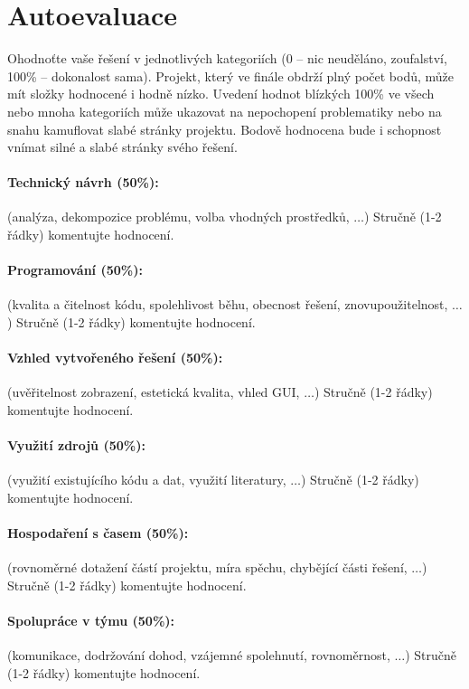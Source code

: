 \documentclass[11pt,a4paper]{article}
\begin{document}
\section{Autoevaluace}

Ohodnoťte vaše řešení v jednotlivých kategoriích (0 – nic neuděláno,
zoufalství, 100\% – dokonalost sama). Projekt, který ve finále obdrží plný
počet bodů, může mít složky hodnocené i hodně nízko. Uvedení hodnot blízkých
100\% ve všech nebo mnoha kategoriích může ukazovat na nepochopení problematiky
nebo na snahu kamuflovat slabé stránky projektu. Bodově hodnocena bude i
schopnost vnímat silné a slabé stránky svého řešení.

\paragraph{Technický návrh (50\%):} (analýza, dekompozice problému, volba
vhodných prostředků, $\ldots$) 
Stručně (1-2 řádky) komentujte hodnocení. 

\paragraph{Programování (50\%):} (kvalita a čitelnost kódu, spolehlivost běhu,
obecnost řešení, znovupoužitelnost, $\ldots$)
Stručně (1-2 řádky) komentujte hodnocení. 

\paragraph{Vzhled vytvořeného řešení (50\%):} (uvěřitelnost zobrazení,
estetická kvalita, vhled GUI, $\ldots$)
Stručně (1-2 řádky) komentujte hodnocení. 

\paragraph{Využití zdrojů (50\%):} (využití existujícího kódu a dat, využití
literatury, $\ldots$)
Stručně (1-2 řádky) komentujte hodnocení. 

\paragraph{Hospodaření s časem (50\%):} (rovnoměrné dotažení částí projektu,
míra spěchu, chybějící části řešení, $\ldots$)
Stručně (1-2 řádky) komentujte hodnocení. 

\paragraph{Spolupráce v týmu (50\%):} (komunikace, dodržování dohod, vzájemné
spolehnutí, rovnoměrnost, $\ldots$)
Stručně (1-2 řádky) komentujte hodnocení. 
\end{document}
